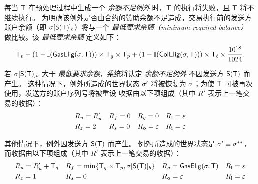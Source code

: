每当 $\textsf{T}$ 在预处理过程中生成一个 \emph{余额不足例外} 时，$\textsf{T}$ 的执行将失败，且 $\textsf{T}$ 将不继续执行。
为明确该例外是否由合约的赞助余额不足造成，交易执行前的发送方账户余额（即 $\mathbf{\sigma}[\mathsf{S}{\left({\textsf{T}} \right)}]_b$）将与一个 \emph{最低要求余额（minimum required balance）} 做比较。该 \emph{最低要求余额} 定义如下： 
\begin{align}
	\textsf{T}_v+(1-\mathbb{I}(\mathsf{GasElig}(\mathbf{\sigma},\textsf{T})))\times \textsf{T}_g \times \textsf{T}_p + (1-\mathbb{I}(\mathsf{ColElig}(\mathbf{\sigma},\textsf{T})))\times \textsf{T}_\ell \times \frac{10^{18}}{1024}.
\end{align}

若 $\mathbf{\sigma}[\mathsf{S}{\left({\textsf{T}} \right)}]_b$ 大于 \emph{最低要求余额}，系统将认定 \emph{余额不足例外} 不因发送方 $\mathsf{S}{\left({\textsf{T}} \right)}$ 而产生。
这种情况下，例外所造成的世界状态 $\mathbf{\sigma}'$ 将被恢复为 $\mathbf{\sigma}$；为使 $\textsf{T}$ 可被再次使用，发送方的账户序列号将被重设
收据由以下项组成（其中 $R'$ 表示上一笔交易的收据）：
\begin{align}
	&R_u=R'_u && R_f=0 && R_g=0 && R_{\bf l}=\mathbb{\varepsilon} \\
	&R_z=2 && R_s=0 && R_{\bf o}=\mathbb{\varepsilon} && R_{\bf i}=\mathbb{\varepsilon}
\end{align}

其他情况下，例外因发送方 $\mathsf{S}{\left({\textsf{T}} \right)}$ 而产生。
例外所造成的世界状态是 $\mathbf{\sigma}'\equiv \mathbf{\sigma}^{**}$，而收据由以下项组成（其中 $R'$ 表示上一笔交易的收据）：
\begin{align}
	&R_u=R'_u+\textsf{T}_g && R_f=\min\{\textsf{T}_g\times\textsf{T}_p,\mathbf{\sigma}[\mathsf{S}{\left({\textsf{T}} \right)}]_b\} && R_g=\mathsf{GasElig}(\mathbf{\sigma},\textsf{T}) && R_{\bf l}=\mathbb{\varepsilon} \\
	&R_z=1 && R_s=0 && R_{\bf o}=\mathbb{\varepsilon} && R_{\bf i}=\mathbb{\varepsilon}
\end{align}


